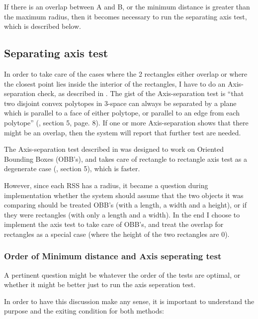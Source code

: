 If there is an overlap between A and B, or the minimum distance is greater than the maximum radius, then it becomes necessary to run the separating axis test, which is described below.

\subsection{Separating axis test}
\label{sepAxis}
In order to take care of the cases where the 2 rectangles either overlap or where the closest point lies inside the interior of the rectangles, I have to do an Axis-separation check, as described in \cite{237244}. The gist of the Axis-separation test is ``that two disjoint convex polytopes in 3-space can always be separated by a plane which is parallel to a face of either polytope, or parallel to an edge from each polytope'' (\cite{237244}, section 5, page. 8). If one or more Axis-separation shows that there might be an overlap, then the system will report that further test are needed.

The Axis-separation test described in \cite{237244} was designed to work on Oriented Bounding Boxes (OBB's), and takes care of rectangle to rectangle axis test as a degenerate case (\cite{237244}, section 5), which is faster. 

However, since each RSS has a radius, it became a question during implementation whether the system should assume that the two objects it was comparing should be treated OBB's (with a length, a width and a height), or if they were rectangles (with only a length and a width). In the end I choose to implement the axis test to take care of OBB's, and treat the overlap for rectangles as a special case (where the height of the two rectangles are 0).

\subsubsection{Order of Minimum distance and Axis seperating test}
\label{minAxisOrder}
A pertinent question might be whatever the order of the tests are optimal, or whether it might be better just to run the axis seperation test.

In order to have this discussion make any sense, it is important to understand the purpose and the exiting condition for both methods:

